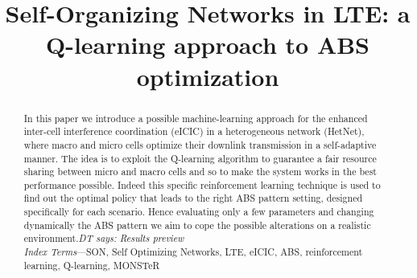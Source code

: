 \documentclass[conference,10pt]{IEEEtran}
\newcommand{\TD}[1]{\textit{\color{blue}DT says: #1}}
\begin{document}
\title{Self-Organizing Networks	in LTE: a Q-learning approach to ABS optimization}

\author{
}

\maketitle
\thispagestyle{plain}
\pagestyle{plain}
\begin{abstract}
In this paper we introduce a possible machine-learning approach for the enhanced inter-cell interference coordination (eICIC) in a heterogeneous network (HetNet), where macro and micro cells optimize their downlink transmission in a self-adaptive manner. The idea is to exploit the Q-learning algorithm to guarantee a fair resource sharing between micro and macro cells and so to make the system works in the best performance possible. Indeed this specific reinforcement learning technique is used to find out the optimal policy that leads to the right ABS pattern setting, designed specifically for each scenario. Hence evaluating only a few parameters and changing dynamically the ABS pattern we aim to cope the possible alterations on a realistic environment.\TD{Results preview}\\

\textit{Index  Terms}---SON, Self Optimizing Networks, LTE, eICIC, ABS, reinforcement learning, Q-learning, MONSTeR     
\end{abstract}

\end{document}
